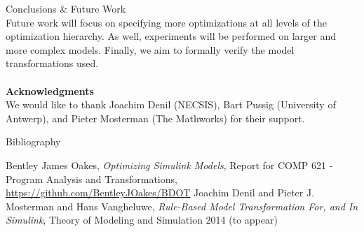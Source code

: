 \documentclass[final,hyperref={pdfpagelabels=false}]{beamer}
\begin{document}
\begin{frame}{}
\begin{columns}[t,totalwidth=\linewidth]
\begin{column}{.4\linewidth}
\begin{block}{Conclusions \& Future Work}
        	   ~\\
        	   Future work will focus on specifying more optimizations at all levels of the optimization hierarchy. As well, experiments will be performed on larger and more complex models. Finally, we aim to formally verify the model transformations used.\\~\\
        	   \footnotesize
        	   \textbf{Acknowledgments}\\
        	   We would like to thank Joachim Denil (NECSIS), Bart Pussig (University of Antwerp), and Pieter Mosterman (The Mathworks) for their support.
             \end{block}
             \vspace{-0.2cm}
             \begin{block}{Bibliography}
             \footnotesize
     	   \begin{thebibliography}{10} 
     	   \vspace{-0.45cm}
     	  \footnotesize
     	    Bentley James Oakes, {\em Optimizing Simulink Models}, Report for COMP 621 - Program Analysis and Transformations, \url{https://github.com/BentleyJOakes/BDOT}
     	    Joachim Denil and Pieter J. Mosterman and Hans Vangheluwe, {\em Rule-Based Model Transformation For, and In Simulink}, Theory of Modeling and Simulation 2014 (to appear)
          		\end{thebibliography}	   
              	\end{block}
                     
                     
           \end{column}

    \end{columns}

  \end{frame}
\end{document}

